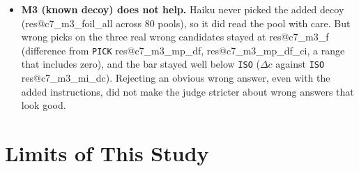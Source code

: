 \documentclass[10pt,twocolumn]{article}
\makeatletter
\newcommand{\res}[1]{\csname res@#1\endcsname}
\makeatother
\begin{document}
\begin{itemize}
\item \textbf{M3 (known decoy) does not help.} Haiku never picked the added decoy (\res{c7_m3_foil_all} across 80 pools), so it did read the pool with care. But wrong picks on the three real wrong candidates stayed at \res{c7_m3_f} (difference from \texttt{PICK} \res{c7_m3_mp_df}, \res{c7_m3_mp_df_ci}, a range that includes zero), and the bar stayed well below \texttt{ISO} ($\Delta c$ against \texttt{ISO} \res{c7_m3_mi_dc}). Rejecting an obvious wrong answer, even with the added instructions, did not make the judge stricter about wrong answers that look good.
\end{itemize}

\section{Limits of This Study}
\end{document}
